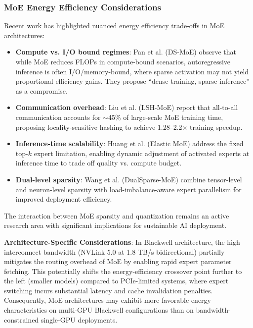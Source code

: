 \documentclass[11pt]{article}
\begin{document}
\subsubsection{MoE Energy Efficiency Considerations}

Recent work has highlighted nuanced energy efficiency trade-offs in MoE architectures:

\begin{itemize}
    \item \textbf{Compute vs. I/O bound regimes}: Pan et al. \cite{pan2024dsmoe} (DS-MoE) observe that while MoE reduces FLOPs in compute-bound scenarios, autoregressive inference is often I/O/memory-bound, where sparse activation may not yield proportional efficiency gains. They propose ``dense training, sparse inference'' as a compromise.
    
    \item \textbf{Communication overhead}: Liu et al. \cite{liu2024lshmoe} (LSH-MoE) report that all-to-all communication accounts for $\sim$45\% of large-scale MoE training time, proposing locality-sensitive hashing to achieve 1.28--2.2$\times$ training speedup.
    
    \item \textbf{Inference-time scalability}: Huang et al. \cite{huang2025elasticmoe} (Elastic MoE) address the fixed top-$k$ expert limitation, enabling dynamic adjustment of activated experts at inference time to trade off quality vs. compute budget.
    
    \item \textbf{Dual-level sparsity}: Wang et al. \cite{wang2025dualsparsemoe} (DualSparse-MoE) combine tensor-level and neuron-level sparsity with load-imbalance-aware expert parallelism for improved deployment efficiency.
\end{itemize}

The interaction between MoE sparsity and quantization remains an active research area with significant implications for sustainable AI deployment.

\textbf{Architecture-Specific Considerations}: In Blackwell architecture, the high interconnect bandwidth (NVLink 5.0 at 1.8 TB/s bidirectional) partially mitigates the routing overhead of MoE by enabling rapid expert parameter fetching. This potentially shifts the energy-efficiency crossover point further to the left (smaller models) compared to PCIe-limited systems, where expert switching incurs substantial latency and cache invalidation penalties. Consequently, MoE architectures may exhibit more favorable energy characteristics on multi-GPU Blackwell configurations than on bandwidth-constrained single-GPU deployments.
\end{document}
